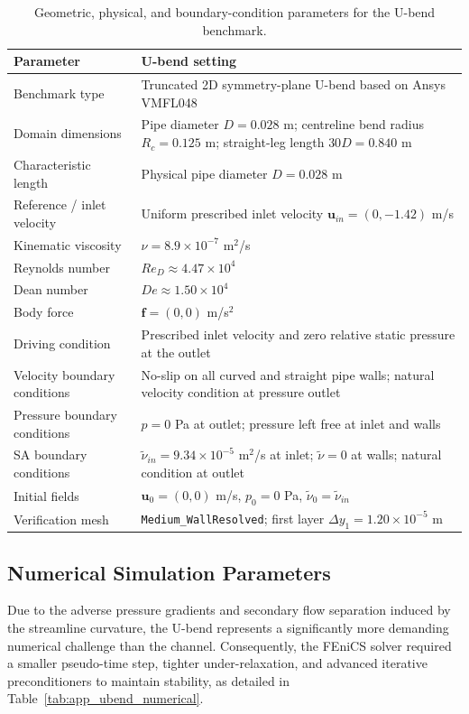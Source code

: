 \begin{table}[htbp]
	\centering
	\footnotesize
	\caption{Geometric, physical, and boundary-condition parameters for the U-bend benchmark.}
	\label{tab:app_ubend_physical}
	\renewcommand{\arraystretch}{1.2}
	\begin{tabularx}{\textwidth}{l X}
		\hline
		\textbf{Parameter} & \textbf{U-bend setting} \\
		\hline
		Benchmark type & Truncated 2D symmetry-plane U-bend based on Ansys VMFL048 \\
		Domain dimensions & Pipe diameter $D=0.028$ m; centreline bend radius $R_c=0.125$ m; straight-leg length $30D=0.840$ m \\
		Characteristic length & Physical pipe diameter $D=0.028$ m \\
		Reference / inlet velocity & Uniform prescribed inlet velocity $\mathbf{u}_{in}=(0,-1.42)$ m/s \\
		Kinematic viscosity & $\nu = 8.9 \times 10^{-7}$ m$^2$/s \\
		Reynolds number & $Re_D \approx 4.47 \times 10^4$ \\
		Dean number & $De \approx 1.50 \times 10^4$ \\
		Body force & $\mathbf{f}=(0,0)$ m/s$^2$ \\
		Driving condition & Prescribed inlet velocity and zero relative static pressure at the outlet \\
		Velocity boundary conditions & No-slip on all curved and straight pipe walls; natural velocity condition at pressure outlet \\
		Pressure boundary conditions & $p=0$ Pa at outlet; pressure left free at inlet and walls \\
		SA boundary conditions & $\tilde{\nu}_{in}=9.34 \times 10^{-5}$ m$^2$/s at inlet; $\tilde{\nu}=0$ at walls; natural condition at outlet \\
		Initial fields & $\mathbf{u}_0=(0,0)$ m/s, $p_0=0$ Pa, $\tilde{\nu}_0=\tilde{\nu}_{in}$ \\
		Verification mesh & \texttt{Medium\_WallResolved}; first layer $\Delta y_1 = 1.20 \times 10^{-5}$ m \\
		\hline
	\end{tabularx}
\end{table}

\subsection{Numerical Simulation Parameters}
\label{subsec:app_ubend_numerical}
Due to the adverse pressure gradients and secondary flow separation induced by the streamline curvature, the U-bend represents a significantly more demanding numerical challenge than the channel. Consequently, the FEniCS solver required a smaller pseudo-time step, tighter under-relaxation, and advanced iterative preconditioners to maintain stability, as detailed in Table~\ref{tab:app_ubend_numerical}.

